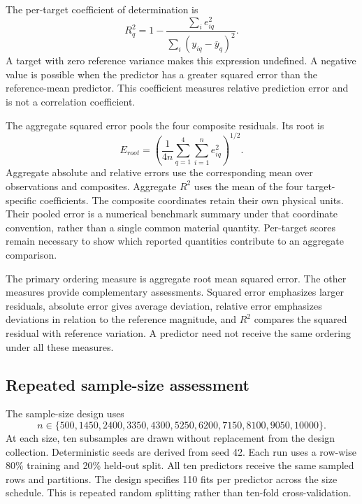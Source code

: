 The per-target coefficient of determination is
\begin{equation}
\label{eq:icsor_coefficient_determination}
R_q^2=1-
\frac{\sum_i e_{iq}^{2}}
{\sum_i(y_{iq}-\overline y_q)^2}.
\end{equation}
A target with zero reference variance makes this expression undefined. A negative value is possible when the predictor has a greater squared error than the reference-mean predictor. This coefficient measures relative prediction error and is not a correlation coefficient.

The aggregate squared error pools the four composite residuals. Its root is
\begin{equation}
\label{eq:icsor_aggregate_root_error}
E_{root}=\left(\frac{1}{4n}\sum_{q=1}^{4}\sum_{i=1}^{n}e_{iq}^{2}\right)^{1/2}.
\end{equation}
Aggregate absolute and relative errors use the corresponding mean over observations and composites. Aggregate \(R^2\) uses the mean of the four target-specific coefficients. The composite coordinates retain their own physical units. Their pooled error is a numerical benchmark summary under that coordinate convention, rather than a single common material quantity. Per-target scores remain necessary to show which reported quantities contribute to an aggregate comparison.

The primary ordering measure is aggregate root mean squared error. The other measures provide complementary assessments. Squared error emphasizes larger residuals, absolute error gives average deviation, relative error emphasizes deviations in relation to the reference magnitude, and \(R^2\) compares the squared residual with reference variation. A predictor need not receive the same ordering under all these measures.

\subsection{Repeated sample-size assessment}

The sample-size design uses
\begin{equation}
\label{eq:icsor_assessment_sizes}
n\in\{500,1450,2400,3350,4300,5250,6200,7150,8100,9050,10000\}.
\end{equation}
At each size, ten subsamples are drawn without replacement from the design collection. Deterministic seeds are derived from seed 42. Each run uses a row-wise 80\% training and 20\% held-out split. All ten predictors receive the same sampled rows and partitions. The design specifies 110 fits per predictor across the size schedule. This is repeated random splitting rather than ten-fold cross-validation.

